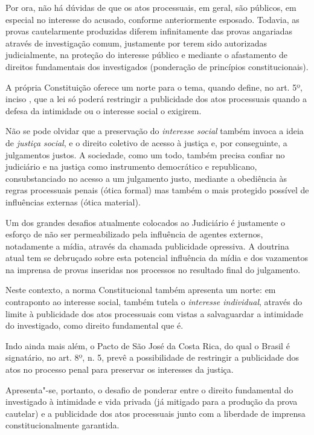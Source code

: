 Por ora, não há dúvidas de que os atos processuais, em geral, são
públicos, em especial no interesse do acusado, conforme anteriormente
esposado. Todavia, as provas cautelarmente produzidas diferem
infinitamente das provas angariadas através de investigação comum,
justamente por terem sido autorizadas judicialmente, na proteção do
interesse público e mediante o afastamento de direitos fundamentais dos
investigados (ponderação de princípios constitucionais).

A própria Constituição oferece um norte para o tema, quando define, no
art. 5º, inciso , que a lei só poderá restringir a publicidade dos
atos processuais quando a defesa da intimidade ou o interesse social o
exigirem.

Não se pode olvidar que a preservação do \emph{interesse social} também
invoca a ideia de \emph{justiça social}, e o direito coletivo de acesso
à justiça e, por conseguinte, a julgamentos justos. A sociedade, como um
todo, também precisa confiar no judiciário e na justiça como instrumento
democrático e republicano, consubstanciado no acesso a um julgamento
justo, mediante a obediência às regras processuais penais (ótica formal)
mas também o mais protegido possível de influências externas (ótica
material).

Um dos grandes desafios atualmente colocados ao Judiciário é justamente
o esforço de não ser permeabilizado pela influência de agentes externos,
notadamente a mídia, através da chamada publicidade opressiva. A
doutrina atual tem se debruçado sobre esta potencial influência da mídia
e dos vazamentos na imprensa de provas inseridas nos processos no
resultado final do julgamento.

Neste contexto, a norma Constitucional também apresenta um norte: em
contraponto ao interesse social, também tutela o \emph{interesse
individual}, através do limite à publicidade dos atos processuais com
vistas a salvaguardar a intimidade do investigado, como direito
fundamental que é.

Indo ainda mais além, o Pacto de São José da Costa Rica, do qual o
Brasil é signatário, no art. 8º, n. 5, prevê a possibilidade de
restringir a publicidade dos atos no processo penal para preservar os
interesses da justiça.

Apresenta"-se, portanto, o desafio de ponderar entre o direito
fundamental do investigado à intimidade e vida privada (já mitigado para
a produção da prova cautelar) e a publicidade dos atos processuais junto
com a liberdade de imprensa constitucionalmente garantida.

